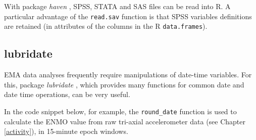 \documentclass[]{book}
\newenvironment{Shaded}{\begin{snugshade}}{\end{snugshade}}
\newcommand{\KeywordTok}[1]{\textcolor[rgb]{0.13,0.29,0.53}{\textbf{#1}}}
\newcommand{\DataTypeTok}[1]{\textcolor[rgb]{0.13,0.29,0.53}{#1}}
\newcommand{\StringTok}[1]{\textcolor[rgb]{0.31,0.60,0.02}{#1}}
\newcommand{\CommentTok}[1]{\textcolor[rgb]{0.56,0.35,0.01}{\textit{#1}}}
\newcommand{\OperatorTok}[1]{\textcolor[rgb]{0.81,0.36,0.00}{\textbf{#1}}}
\newcommand{\NormalTok}[1]{#1}
\begin{document}
 

With package \emph{haven} \citep{R-haven}, SPSS, STATA and SAS files can
be read into R. A particular advantage of the \texttt{read.sav} function
is that SPSS variables definitions are retained (in attributes of the
columns in the R \texttt{data.frames}).

\begin{Shaded}
\end{Shaded}

\subsection{lubridate}\label{lubridate}

 

EMA data analyses frequently require manipulations of date-time
variables. For this, package \emph{lubridate} \citep{R-lubridate}, which
provides many functions for common date and date time operations, can be
very useful.

In the code snippet below, for example, the \texttt{round\_date}
function is used to calculate the ENMO value from raw tri-axial
accelerometer data (see Chapter \ref{activity}), in 15-minute epoch
windows.
\end{document}
